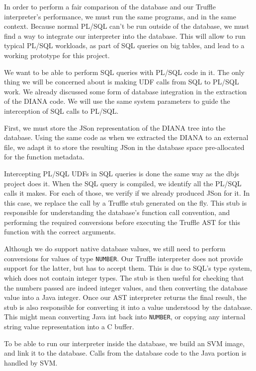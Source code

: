 \documentclass[twoside,11pt,a4paper]{article}
\newcommand{\java}[1]{\textsf{#1}}
\newcommand{\pls}[1]{\small\texttt{#1}\normalsize}
\newcommand{\plstype}[1]{\pls{#1}}
\newcommand{\oranum}{\plstype{NUMBER}}
\begin{document}
In order to perform a fair comparison of the database and our Truffle interpreter's performance, we must run the same programs, and in the same context. Because normal PL/SQL can't be run outside of the database, we must find a way to integrate our interpreter into the database. This will allow to run typical PL/SQL workloads, as part of SQL queries on big tables, and lead to a working prototype for this project.

We want to be able to perform SQL queries with PL/SQL code in it. The only thing we will be concerned about is making UDF calls from SQL to PL/SQL work. We already discussed some form of database integration in the extraction of the DIANA code. We will use the same system parameters to guide the interception of SQL calls to PL/SQL.

First, we must store the JSon representation of the DIANA tree into the database. Using the same code as when we extracted the DIANA to an external file, we adapt it to store the resulting JSon in the database space pre-allocated for the function metadata.

Intercepting PL/SQL UDFs in SQL queries is done the same way as the dbjs project does it. When the SQL query is compiled, we identify all the PL/SQL calls it makes. For each of those, we verify if we already produced JSon for it. In this case, we replace the call by a Truffle stub generated on the fly. This stub is responsible for understanding the database's function call convention, and performing the required conversions before executing the Truffle AST for this function with the correct arguments.

Although we do support native database values, we still need to perform conversions for values of type \oranum{}. Our Truffle interpreter does not provide support for the latter, but has to accept them. This is due to SQL's type system, which does not contain integer types. The stub is then useful for checking that the numbers passed are indeed integer values, and then converting the database value into a Java integer. Once our AST interpreter returns the final result, the stub is also responsible for converting it into a value understood by the database. This might mean converting Java \java{int} back into \oranum{}, or copying any internal string value representation into a C buffer.

To be able to run our interpreter inside the database, we build an SVM image, and link it to the database. Calls from the database code to the Java portion is handled by SVM.
\end{document}
